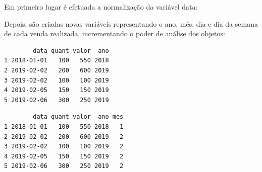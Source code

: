 \documentclass[12pt,brazil,oneside]{book}
\newenvironment{Shaded}{\begin{snugshade}}{\end{snugshade}}
\newcommand{\CommentTok}[1]{\textcolor[rgb]{0.56,0.35,0.01}{\textit{#1}}}
\newcommand{\KeywordTok}[1]{\textcolor[rgb]{0.13,0.29,0.53}{\textbf{#1}}}
\newcommand{\NormalTok}[1]{#1}
\newcommand{\OperatorTok}[1]{\textcolor[rgb]{0.81,0.36,0.00}{\textbf{#1}}}
\begin{document}
Em primeiro lugar é efetuada a normalização da variável data:

\begin{Shaded}
\end{Shaded}

Depois, são criadas novas variáveis representando o ano, mês, dia e dia da semana de cada venda realizada, incrementando o poder de análise dos objetos:

\begin{Shaded}
\end{Shaded}

\begin{verbatim}
        data quant valor  ano
1 2018-01-01   100   550 2018
2 2019-02-02   200   600 2019
3 2019-02-02   100   100 2019
4 2019-02-05   150   150 2019
5 2019-02-06   300   250 2019
\end{verbatim}

\begin{Shaded}
\end{Shaded}

\begin{verbatim}
        data quant valor  ano mes
1 2018-01-01   100   550 2018   1
2 2019-02-02   200   600 2019   2
3 2019-02-02   100   100 2019   2
4 2019-02-05   150   150 2019   2
5 2019-02-06   300   250 2019   2
\end{verbatim}

\begin{Shaded}
\end{Shaded}
\end{document}
